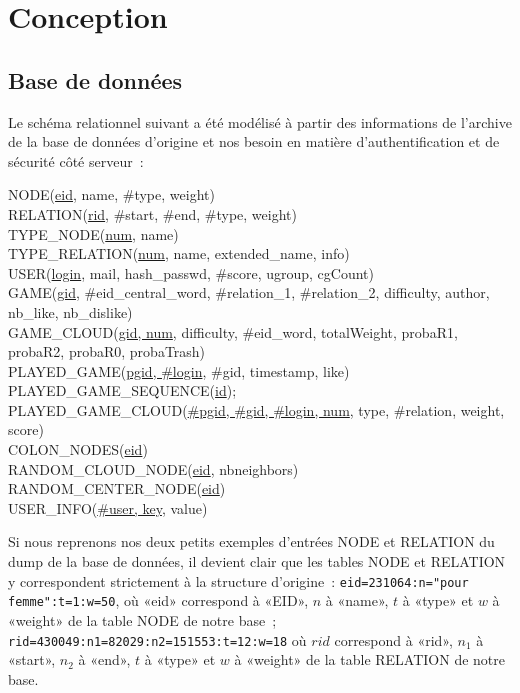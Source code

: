 \documentclass[a4paper,11pt,french]{article}
\begin{document}
\pagebreak

\section{Conception}



\subsection{Base de données}

Le schéma relationnel suivant a été modélisé à partir des informations de l'archive de la base de données d'origine et nos besoin en matière d'authentification et de sécurité côté serveur~:


{\footnotesize
NODE(\underline{eid}, name, \#type, weight) \\ 
RELATION(\underline{rid}, \#start, \#end, \#type, weight) \\
TYPE\_NODE(\underline{num}, name) \\
TYPE\_RELATION(\underline{num}, name, extended\_name, info) \\
USER(\underline{login}, mail, hash\_passwd, \#score, ugroup, cgCount) \\
GAME(\underline{gid}, \#eid\_central\_word, \#relation\_1, \#relation\_2, difficulty, author, nb\_like, nb\_dislike) \\
GAME\_CLOUD(\underline{gid, num}, difficulty, \#eid\_word, totalWeight, probaR1, probaR2, probaR0, probaTrash) \\
PLAYED\_GAME(\underline{pgid, \#login}, \#gid, timestamp, like) \\
PLAYED\_GAME\_SEQUENCE(\underline{id}); \\
PLAYED\_GAME\_CLOUD(\underline{\#pgid, \#gid, \#login, num}, type, \#relation, weight, score)  \\
COLON\_NODES(\underline{eid}) \\
RANDOM\_CLOUD\_NODE(\underline{eid}, nbneighbors) \\
RANDOM\_CENTER\_NODE(\underline{eid}) \\
USER\_INFO(\underline{\#user, key}, value) \\
}










Si nous reprenons nos deux petits exemples d'entrées NODE et RELATION du dump de la base de données, il devient clair que les tables NODE et
RELATION y correspondent strictement à la structure d'origine~: \verb!eid=231064:n="pour femme":t=1:w=50!, où «eid» correspond à «EID», $n$ à
«name», $t$ à «type» et $w$ à «weight» de la table NODE de notre base~; \verb!rid=430049:n1=82029:n2=151553:t=12:w=18! où $rid$ correspond à «rid»,
$n_1$ à «start», $n_2$ à «end», $t$ à «type» et $w$ à «weight» de la table RELATION de notre base.
\end{document}
